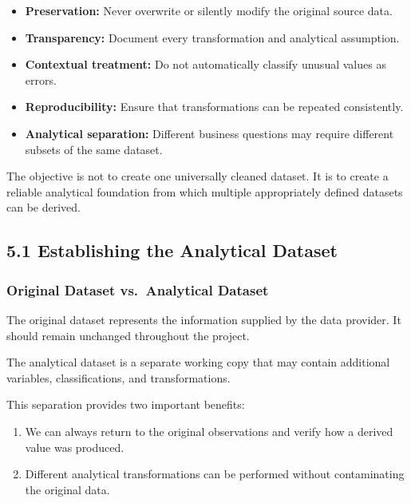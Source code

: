 \documentclass[11pt]{article}
\providecommand{\tightlist}{%
      \setlength{\itemsep}{0pt}\setlength{\parskip}{0pt}}
\begin{document}
\begin{itemize}
\tightlist
\item
  \textbf{Preservation:} Never overwrite or silently modify the original
  source data.
\item
  \textbf{Transparency:} Document every transformation and analytical
  assumption.
\item
  \textbf{Contextual treatment:} Do not automatically classify unusual
  values as errors.
\item
  \textbf{Reproducibility:} Ensure that transformations can be repeated
  consistently.
\item
  \textbf{Analytical separation:} Different business questions may
  require different subsets of the same dataset.
\end{itemize}

The objective is not to create one universally cleaned dataset. It is to
create a reliable analytical foundation from which multiple
appropriately defined datasets can be derived.

    \subsection{5.1 Establishing the Analytical
Dataset}\label{establishing-the-analytical-dataset}

\subsubsection{Original Dataset vs.~Analytical
Dataset}\label{original-dataset-vs.-analytical-dataset}

The original dataset represents the information supplied by the data
provider. It should remain unchanged throughout the project.

The analytical dataset is a separate working copy that may contain
additional variables, classifications, and transformations.

This separation provides two important benefits:

\begin{enumerate}
\def\labelenumi{\arabic{enumi}.}
\tightlist
\item
  We can always return to the original observations and verify how a
  derived value was produced.
\item
  Different analytical transformations can be performed without
  contaminating the original data.
\end{enumerate}
\end{document}
